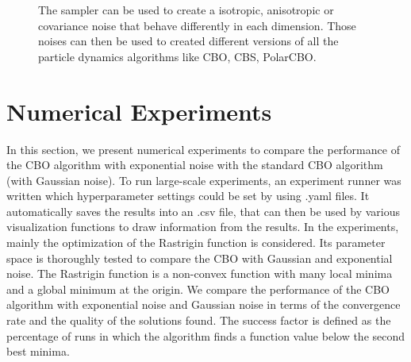 \documentclass[a4paper, 11pt]{article}
\begin{document}
\begin{figure}[!ht]
\centering
{}
\hspace{3em}
\caption{The sampler can be used to create a isotropic, anisotropic or covariance noise that behave differently in each dimension. Those noises can then be used to created different versions of all the particle dynamics algorithms like CBO, CBS, PolarCBO.} \vspace{-1em}
\label{fig:noise}
\end{figure}

\section{Numerical Experiments}
In this section, we present numerical experiments to compare the performance of the CBO algorithm with exponential noise with the standard CBO algorithm (with Gaussian noise).
To run large-scale experiments, an experiment runner was written which hyperparameter settings could be set by using .yaml files. It automatically saves the results into an .csv file, that can then be used by various visualization functions to draw information from the results.
In the experiments, mainly the optimization of the Rastrigin function is considered. Its parameter space is thoroughly tested to compare the CBO with Gaussian and exponential noise. The Rastrigin function is a non-convex function with many local minima and a global minimum at the origin. We compare the performance of the CBO algorithm with exponential noise and Gaussian noise in terms of the convergence rate and the quality of the solutions found. The success factor is defined as the percentage of runs in which the algorithm finds a function value below the second best minima.
\end{document}
